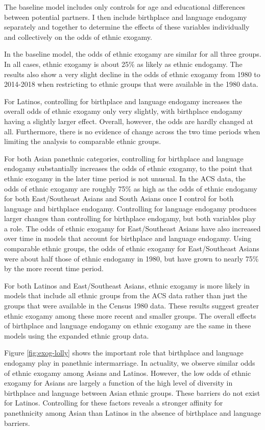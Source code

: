 \documentclass[11pt,]{article}
\begin{document}
The baseline model includes only controls for age and educational differences between potential partners. I then include birthplace and language endogamy separately and together to determine the effects of these variables individually and collectively on the odds of ethnic exogamy.

In the baseline model, the odds of ethnic exogamy are similar for all three groups. In all cases, ethnic exogamy is about 25\% as likely as ethnic endogamy. The results also show a very slight decline in the odds of ethnic exogamy from 1980 to 2014-2018 when restricting to ethnic groups that were available in the 1980 data.

For Latinos, controlling for birthplace and language endogamy increases the overall odds of ethnic exogamy only very slightly, with birthplace endogamy having a slightly larger effect. Overall, however, the odds are hardly changed at all. Furthermore, there is no evidence of change across the two time periods when limiting the analysis to comparable ethnic groups.

For both Asian panethnic categories, controlling for birthplace and language endogamy substantially increases the odds of ethnic exogamy, to the point that ethnic exogamy in the later time period is not unusual. In the ACS data, the odds of ethnic exogamy are roughly 75\% as high as the odds of ethnic endogamy for both East/Southeast Asians and South Asians once I control for both language and birthplace endogamy. Controlling for language endogamy produces larger changes than controlling for birthplace endogamy, but both variables play a role. The odds of ethnic exogamy for East/Southeast Asians have also increased over time in models that account for birthplace and language endogamy. Using comparable ethnic groups, the odds of ethnic exogamy for East/Southeast Asians were about half those of ethnic endogamy in 1980, but have grown to nearly 75\% by the more recent time period.

For both Latinos and East/Southeast Asians, ethnic exogamy is more likely in models that include all ethnic groups from the ACS data rather than just the groups that were available in the Census 1980 data. These results suggest greater ethnic exogamy among these more recent and smaller groups. The overall effects of birthplace and language endogamy on ethnic exogamy are the same in these models using the expanded ethnic group data.

Figure \ref{fig:exog-lolly} shows the important role that birthplace and language endogamy play in panethnic intermarriage. In actuality, we observe similar odds of ethnic exogamy among Asians and Latinos. However, the low odds of ethnic exogamy for Asians are largely a function of the high level of diversity in birthplace and language between Asian ethnic groups. These barriers do not exist for Latinos. Controlling for these factors reveals a stronger affinity for panethnicity among Asian than Latinos in the absence of birthplace and language barriers.
\end{document}
